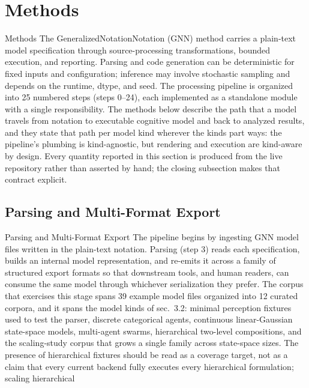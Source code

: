 \documentclass[
  ignorenonframetext,
]{beamer}
\author{\texorpdfstring{}{}}
\date{}
\begin{document}
\section{Methods}\label{sec:methods}

\begin{frame}[allowframebreaks]{Methods}
The GeneralizedNotationNotation (GNN) method carries a plain-text model
specification through source-processing transformations, bounded
execution, and reporting. Parsing and code generation can be
deterministic for fixed inputs and configuration; inference may involve
stochastic sampling and depends on the runtime, dtype, and seed. The
processing pipeline is organized into 25 numbered steps (steps 0--24),
each implemented as a standalone module with a single responsibility.
The methods below describe the path that a model travels from notation
to executable cognitive model and back to analyzed results, and they
state that path per model kind wherever the kinds part ways: the
pipeline's plumbing is kind-agnostic, but rendering and execution are
kind-aware by design. Every quantity reported in this section is
produced from the live repository rather than asserted by hand; the
closing subsection makes that contract explicit.
\end{frame}

\subsection{Parsing and Multi-Format
Export}\label{parsing-and-multi-format-export}

\begin{frame}[allowframebreaks]{Parsing and Multi-Format Export}
The pipeline begins by ingesting GNN model files written in the
plain-text notation. Parsing (step 3) reads each specification, builds
an internal model representation, and re-emits it across a family of
structured export formats so that downstream tools, and human readers,
can consume the same model through whichever serialization they prefer.
The corpus that exercises this stage spans 39 example model files
organized into 12 curated corpora, and it spans the model kinds of
sec.~3.2: minimal perception fixtures used to test the
parser, discrete categorical agents, continuous linear-Gaussian
state-space models, multi-agent swarms, hierarchical two-level
compositions, and the scaling-study corpus that grows a single family
across state-space sizes. The presence of hierarchical fixtures should
be read as a coverage target, not as a claim that every current backend
fully executes every hierarchical formulation; scaling hierarchical
\end{frame}
\end{document}
